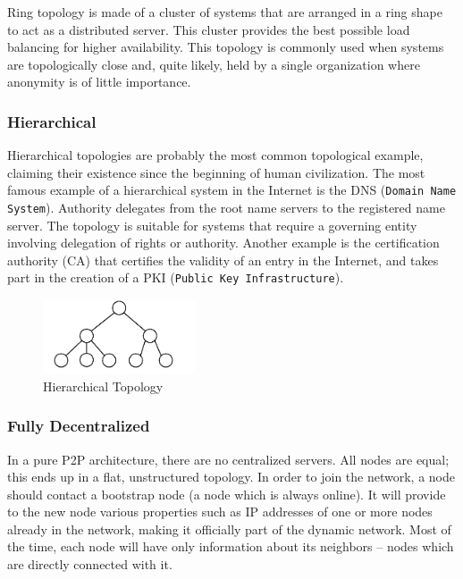 Ring topology is made of a cluster of systems that are arranged in a ring shape
to act as a distributed server. This cluster provides the best possible load
balancing for higher availability. This topology is commonly used when systems
are topologically close and, quite likely, held by a single organization where
anonymity is of little importance.

\subsubsection{Hierarchical}

Hierarchical topologies are probably the most common topological example,
claiming their existence since the beginning of human civilization. The most
famous example of a hierarchical system in the Internet is the DNS
(\texttt{Domain Name System}). Authority delegates from the root name servers
to the registered name server. The topology is suitable for systems that
require a governing entity involving delegation of rights or authority.
Another example is the certification authority (CA) that certifies the
validity of an entry in the Internet, and takes part in the creation of a PKI
(\texttt{Public Key Infrastructure}).

\begin{figure}
  \centering
  \includegraphics[width=0.4\textwidth]{src/img/p2p-systems/hierarchical}
  \caption{Hierarchical Topology}
  \label{fig:p2p-systems:hierarchical}
\end{figure}

\subsubsection{Fully Decentralized}

In a pure P2P architecture, there are no centralized servers. All nodes are
equal; this ends up in a flat, unstructured topology. In order to join the
network, a node should contact a bootstrap node (a node which is always online).
It will provide to the new node various properties such as IP addresses of one
or more nodes already in the network, making it officially part of the dynamic
network. Most of the time, each node will have only information about its
neighbors -- nodes which are directly connected with it.

